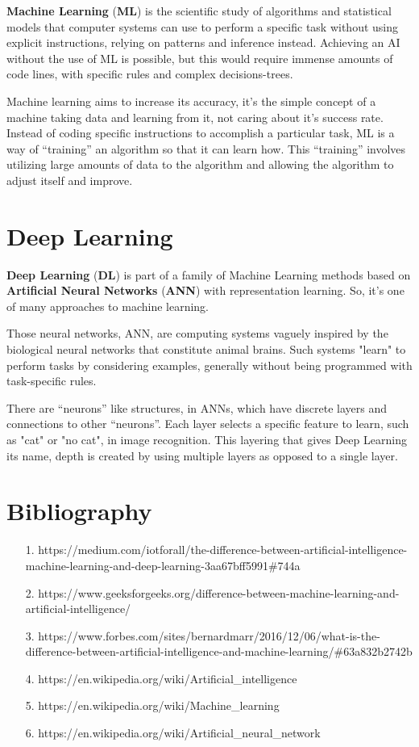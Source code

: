 \documentclass{article}
\begin{document}
    \textbf{Machine Learning} (\textbf{ML}) is the scientific study of algorithms and statistical models that computer systems can use to perform a specific task without using explicit instructions, relying on patterns and inference instead.  Achieving an AI without the use of ML is possible, but this would require immense amounts of code lines, with specific rules and complex decisions-trees.
    
    Machine learning aims to increase its accuracy, it's the simple concept of a machine taking data and learning from it, not caring about it's success rate. Instead of coding specific instructions to accomplish a particular task, ML is a way of “training” an algorithm so that it can learn how. This “training” involves utilizing large amounts of data to the algorithm and allowing the algorithm to adjust itself and improve.
    

\section{Deep Learning}

    \textbf{Deep Learning} (\textbf{DL}) is part of a family of Machine Learning methods based on \textbf{Artificial Neural Networks} (\textbf{ANN}) with representation learning. So, it's one of many approaches to machine learning.
    
    Those neural networks, ANN, are computing systems vaguely inspired by the biological neural networks that constitute animal brains.  Such systems "learn" to perform tasks by considering examples, generally without being programmed with task-specific rules.
    
    There are “neurons” like structures, in ANNs, which have discrete layers and connections to other “neurons”. Each layer selects a specific feature to learn, such as "cat" or "no cat", in image recognition. This layering that gives Deep Learning its name, depth is created by using multiple layers as opposed to a single layer.

\section{Bibliography}

    \begin{itemize}
        \item[1.] https://medium.com/iotforall/the-difference-between-artificial-intelligence-machine-learning-and-deep-learning-3aa67bff5991\#744a
        \item[2.] https://www.geeksforgeeks.org/difference-between-machine-learning-and-artificial-intelligence/
        \item[3.] https://www.forbes.com/sites/bernardmarr/2016/12/06/what-is-the-difference-between-artificial-intelligence-and-machine-learning/\#63a832b2742b
        \item[4.] https://en.wikipedia.org/wiki/Artificial\_intelligence
        \item[5.] https://en.wikipedia.org/wiki/Machine\_learning
        \item[6.] https://en.wikipedia.org/wiki/Artificial\_neural\_network
        
    \end{itemize}
\end{document}
